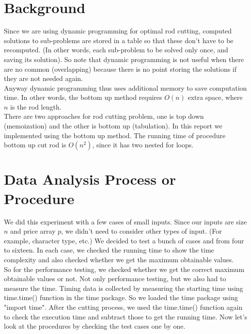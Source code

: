 \documentclass{article}
\begin{document}
\section{\textbf{Background}}
\indent \indent Since we are using dynamic programming for optimal rod cutting, computed solutions to sub-problems are stored in a table so that these don't have to be recomputed. (In other words, each sub-problem to be solved only once, and saving its solution). So note that dynamic programming is not useful when there are no common (overlapping) because there is no point storing the solutions if they are not needed again. \\
\indent Anyway dynamic programming thus uses additional memory to save computation time. In other words, the bottom up method requires $O(n)$ extra space, where $n$ is the rod length. \\
\indent There are two approaches for rod cutting problem, one is top down (memoization) and the other is bottom up (tabulation). In this report we implemented using the bottom up method. The running time of procedure bottom up cut rod is $O(n^2)$, since it has two nested for loops.


\section{\textbf{Data Analysis Process or Procedure}}
\indent \indent We did this experiment with a few cases of small inputs. Since our inputs are size $n$ and price array $p$, we didn't need to consider other types of input. (For example, character type, etc.) We decided to test a bunch of cases and from four to sixteen. In each case, we checked the running time to show the time complexity and also checked whether we get the maximum obtainable values. \\
\indent So for the performance testing, we checked whether we get the correct maximum obtainable values or not. Not only performance testing, but we also had to measure the time. Timing data is collected by measuring the starting time using time.time() function in the time package. So we loaded the time package using "import time". After the cutting process, we used the time.time() function again to check the execution time and subtract those to get the running time. 
Now let's look at the procedures by checking the test cases one by one.
\end{document}

